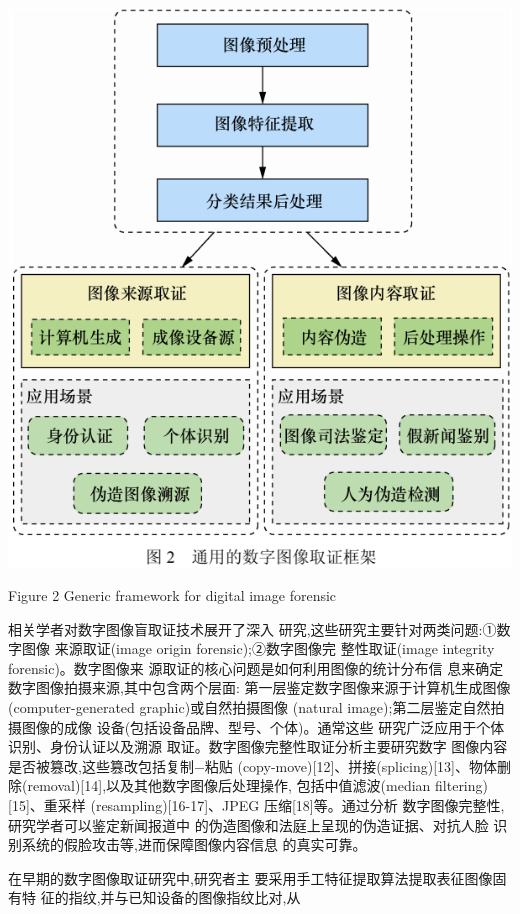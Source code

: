 \documentclass{article}
\begin{document}
\includegraphics{_page_2_Figure_3.png}


Figure 2 Generic framework for digital image forensic

相关学者对数字图像盲取证技术展开了深入 研究,这些研究主要针对两类问题:①数字图像 来源取证(image origin forensic);②数字图像完 整性取证(image integrity forensic)。数字图像来 源取证的核心问题是如何利用图像的统计分布信 息来确定数字图像拍摄来源,其中包含两个层面: 第一层鉴定数字图像来源于计算机生成图像 (computer-generated graphic)或自然拍摄图像 (natural image);第二层鉴定自然拍摄图像的成像 设备(包括设备品牌、型号、个体)。通常这些 研究广泛应用于个体识别、身份认证以及溯源 取证。数字图像完整性取证分析主要研究数字 图像内容是否被篡改,这些篡改包括复制−粘贴 (copy-move)[12]、拼接(splicing)[13]、物体删 除(removal)[14],以及其他数字图像后处理操作, 包括中值滤波(median filtering)[15]、重采样 (resampling)[16-17]、JPEG 压缩[18]等。通过分析 数字图像完整性,研究学者可以鉴定新闻报道中 的伪造图像和法庭上呈现的伪造证据、对抗人脸 识别系统的假脸攻击等,进而保障图像内容信息 的真实可靠。

在早期的数字图像取证研究中,研究者主 要采用手工特征提取算法提取表征图像固有特 征的指纹,并与已知设备的图像指纹比对,从
\end{document}
